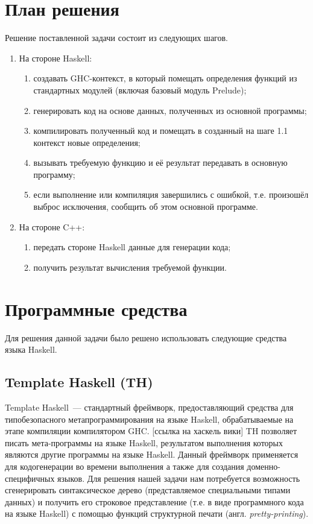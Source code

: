 \section{План решения}
Решение поставленной задачи состоит из следующих шагов.
\begin{enumerate}[1.]
	\item На стороне Haskell:
		\begin{enumerate}[1)]
			\item создавать GHC-контекст, в который помещать определения функций из стандартных модулей (включая базовый модуль Prelude);
			\item генерировать код на основе данных, полученных из основной программы;
			\item компилировать полученный код и помещать в созданный на шаге 1.1 контекст новые определения;
			\item вызывать требуемую функцию и её результат передавать в основную программу;
			\item если выполнение или компиляция завершились с ошибкой, т.е. произошёл выброс исключения, сообщить об этом основной программе.
		\end{enumerate}
	\item На стороне C++:
		\begin{enumerate}[1)]
			\item передать стороне Haskell данные для генерации кода;
			\item получить результат вычисления требуемой функции.
		\end{enumerate}
\end{enumerate}
\section{Программные средства}
Для решения данной задачи было решено использовать следующие средства языка Haskell.

	\subsection{Template Haskell (TH)} Template Haskell~--- стандартный фреймворк, предоставляющий средства для типобезопасного метапрограммирования на языке Haskell, обрабатываемые на этапе компиляции компилятором GHC. [ссылка на хаскель вики]  TH позволяет писать мета-программы на языке Haskell, результатом выполнения которых являются другие программы на языке Haskell. Данный фреймворк применяется для кодогенерации во времени выполнения а также для создания доменно-специфичных языков. Для решения нашей задачи нам потребуется возможность сгенерировать синтаксическое дерево (представляемое специальными типами данных) и получить его строковое представление (т.е. в виде программного кода на языке Haskell) с помощью функций структурной печати (англ. \textit{pretty-printing}).
	
